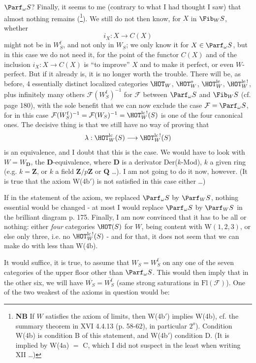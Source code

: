 
$\Parf_\omega S$? Finally, it seems to me (contrary to what I had thought I saw) that almost nothing remains (\footnote{\textbf{NB} If $W$ satisfies the axiom of limits, then W(4b$'$) implies W(4b), cf. the summary theorem in XVI 4.4.13 (p. 58-62), in particular $2^{o}$). Condition W(4b) is condition B of this statement, and W(4b$'$) condition D. (It is implied by W(4a) $=$ C, which I did not suspect in the least when writing XII \dots)}). We still do not then know, for $X$ in $\Fib_W S$, whether
\[ i_X : X \longrightarrow C(X) \]
might not be in $W^{\mathrm{f}}_S$, and not only in $W_S$; we only know it for $X \in \Parf_\omega S$, but in this case we do not need it, for the point of the functor $C(X)$ and of the inclusion $i_X : X \longrightarrow C(X)$ is ``to improve'' $X$ and to make it perfect, or even $W$-perfect. But if it already is, it is no longer worth the trouble. There will be, as
before, 4 essentially distinct localized categories $\HOT_W$, $\HOT^{o}_W$, $\HOT^{\mathrm{lc}}_W$, $\HOT^{\mathrm{lc}\,!}_W$, plus infinitely many others $\mathcal{F}(W^{\mathrm{f}}_S)^{-1}$ for $\mathcal{F}$ between $\Parf_\omega S$ and $\Fib_W S$ (cf. page 180), with the sole benefit that we can now exclude the case $\mathcal{F} = \Parf_\omega S$, for in this case $\mathcal{F}(W^{\mathrm{f}}_S)^{-1} = \mathcal{F}(W_S)^{-1} = \HOT^{\mathrm{lc}\,!}_W(S)$ is one of the four canonical ones. The decisive thing is that we still have no way of proving that
\[ \lambda : \HOT^{\mathrm{lc}}_W(S) \longrightarrow \HOT^{\mathrm{lc}\,!}_W(S) \]
is an equivalence, and I doubt that this is the case. We would have to look with $W = W_{\mathbf{D}}$, the $\mathbf{D}$-equivalence, where $\mathbf{D}$ is a derivator Der($k$-Mod), $k$ a given ring (e.g. $k = \mathbf{Z}$, or $k$ a field $\mathbf{Z}/p\mathbf{Z}$ or $\mathbf{Q}$ \dots). I am not going to do it now, however. (It is true that the axiom W(4b$'$) is not satisfied in this case either \dots)

If in the statement of the axiom, we replaced $\Parf_\omega S$ by $\Parf_W S$, nothing essential would be changed - at most I would replace $\Parf_\omega S$ by $\Parf_W S$ in the brilliant diagram p. 175. Finally, I am now convinced that it has to be all or nothing: either \textit{four} categories $\HOT(S)$ for $W$, being content with W$(1,2,3)$, or else only three, i.e. no $\HOT^{\mathrm{lc}\,!}_W(S)$ - and for that, it does not seem that we can make do with less than W(4b).

It would suffice, it is true, to assume that $W_S = W^{\mathrm{f}}_S$ on any one of the seven categories of the upper floor other than $\Parf_\omega S$. This would then imply that in the other six, we will have $\overline{W_S} = \overline{W^{\mathrm{f}}_S}$ (same strong saturations in $\mathrm{Fl}(\mathcal{F})$). One of the two weakest of the axioms in question would be: %

